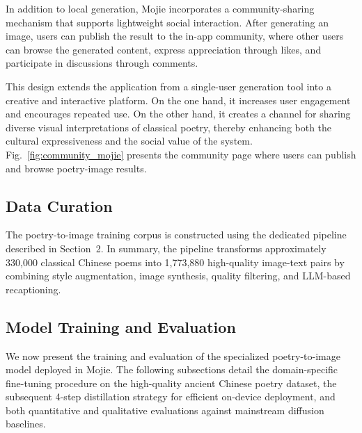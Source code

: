 In addition to local generation, Mojie incorporates a community-sharing mechanism that supports lightweight social interaction. After generating an image, users can publish the result to the in-app community, where other users can browse the generated content, express appreciation through likes, and participate in discussions through comments.

This design extends the application from a single-user generation tool into a creative and interactive platform. On the one hand, it increases user engagement and encourages repeated use. On the other hand, it creates a channel for sharing diverse visual interpretations of classical poetry, thereby enhancing both the cultural expressiveness and the social value of the system. Fig.~\ref{fig:community_mojie} presents the community page where users can publish and browse poetry-image results.

\subsection{Data Curation}
\label{sec:Data Curation}

The poetry-to-image training corpus is constructed using the dedicated pipeline described in Section~2. In summary, the pipeline transforms approximately 330,000 classical Chinese poems into 1,773,880 high-quality image-text pairs by combining style augmentation, image synthesis, quality filtering, and LLM-based recaptioning.

\subsection{Model Training and Evaluation}
\label{sec:modelTrainingAndEvaluation}

We now present the training and evaluation of the specialized poetry-to-image model deployed in Mojie. The following subsections detail the domain-specific fine-tuning procedure on the high-quality ancient Chinese poetry dataset, the subsequent 4-step distillation strategy for efficient on-device deployment, and both quantitative and qualitative evaluations against mainstream diffusion baselines.

